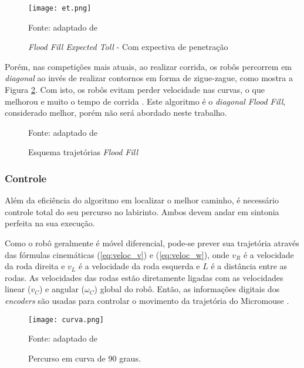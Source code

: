 \begin{figure}[!htb]
	\caption{\label{fig:et}\emph{Flood Fill Expected Toll} - Com expectiva de penetração}
	\begin{center}
		\texttt{[image: et.png]}
	\end{center}
	\centering
	\small Fonte: adaptado de 
\end{figure}

Porém, nas competições mais atuais, ao realizar corrida, os robôs percorrem em \emph{diagonal} ao invés de realizar contornos em forma de zigue-zague, como mostra a Figura \ref{fig:trajetorias}. Com isto, os robôs evitam perder velocidade nas curvas, o que melhorou e muito o tempo de corrida \cite{6734188}. Este algoritmo é o \emph{diagonal Flood Fill}, considerado melhor, porém não será abordado neste trabalho.

\begin{figure}[!htb]
	\caption[Esquema trajetórias \emph{Flood Fill} clássico e diagonal]{\label{fig:trajetorias}Esquema trajetórias \emph{Flood Fill}}
	\begin{center}
		\hspace*{0.1\linewidth}
	\end{center}
	\centering
	\small Fonte: adaptado de 
\end{figure}


\subsubsection{Controle}
Além da eficiência do algoritmo em localizar o melhor caminho, é necessário controle total do seu percurso no labirinto. Ambos devem andar em sintonia perfeita na sua execução.

Como o robô geralmente é móvel diferencial, pode-se prever sua trajetória através das fórmulas cinemáticas (\ref{eq:veloc_v}) e (\ref{eq:veloc_w}), onde $v_R$ é a velocidade da roda direita e $v_L$ é a velocidade da roda esquerda e $L$ é a distância entre as rodas. As velocidades das rodas estão diretamente ligadas com as velocidades linear ($v_C$) e angular ($\omega_C$) global do robô. Então, as informações digitais dos \emph{encoders} são usadas para controlar o movimento da trajetória do Micromouse \cite{6734188}.

\begin{figure}[!htb]
	\caption{\label{fig:curva}Percurso em curva de 90 graus.}
	\begin{center}
		\texttt{[image: curva.png]}
	\end{center}
	\centering
	\small Fonte: adaptado de 
\end{figure}

